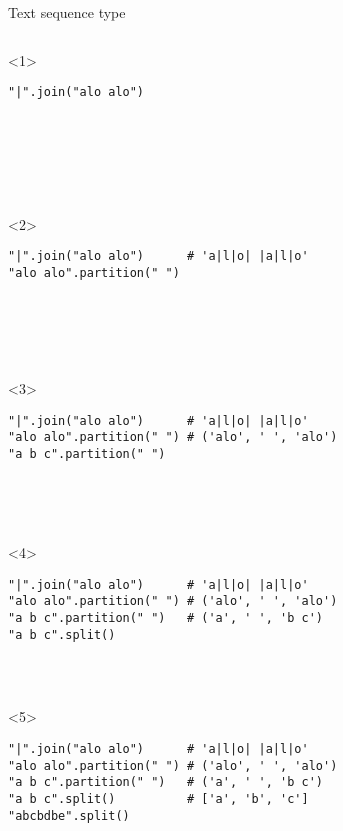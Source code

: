 \begin{frame}[fragile]{Text sequence type}

  \begin{columns}[onlytextwidth]
    \begin{column}{\textwidth}

      \begin{onlyenv}<1>
        \begin{lstlisting}[style=python]
"|".join("alo alo")







 \end{lstlisting}
      \end{onlyenv}

      \begin{onlyenv}<2>
        \begin{lstlisting}[style=python]
"|".join("alo alo")      # 'a|l|o| |a|l|o'
"alo alo".partition(" ")






 \end{lstlisting}
      \end{onlyenv}

      \begin{onlyenv}<3>
        \begin{lstlisting}[style=python]
"|".join("alo alo")      # 'a|l|o| |a|l|o'
"alo alo".partition(" ") # ('alo', ' ', 'alo')
"a b c".partition(" ")





 \end{lstlisting}
      \end{onlyenv}

      \begin{onlyenv}<4>
        \begin{lstlisting}[style=python]
"|".join("alo alo")      # 'a|l|o| |a|l|o'
"alo alo".partition(" ") # ('alo', ' ', 'alo')
"a b c".partition(" ")   # ('a', ' ', 'b c')
"a b c".split()




 \end{lstlisting}
      \end{onlyenv}

      \begin{onlyenv}<5>
        \begin{lstlisting}[style=python]
"|".join("alo alo")      # 'a|l|o| |a|l|o'
"alo alo".partition(" ") # ('alo', ' ', 'alo')
"a b c".partition(" ")   # ('a', ' ', 'b c')
"a b c".split()          # ['a', 'b', 'c']
"abcbdbe".split()




\end{lstlisting}
\end{onlyenv}
\end{column}
\end{columns}
\end{frame}
